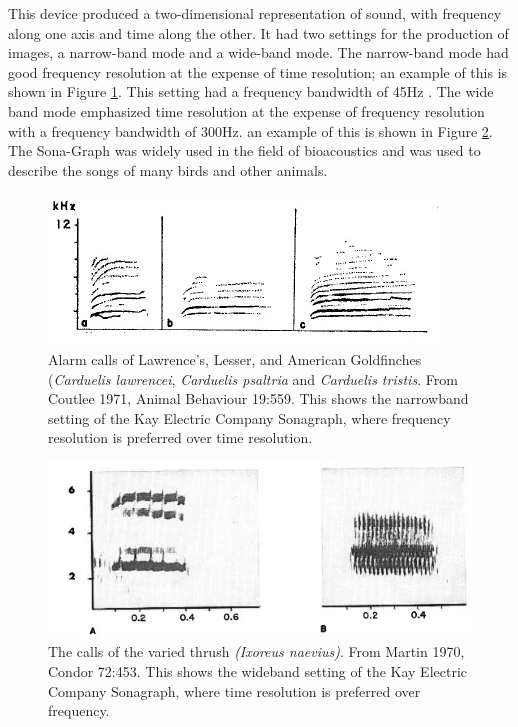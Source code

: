 \documentclass[12pt,oneside]{book}
\begin{document}
This device produced a two-dimensional representation of sound, with
frequency along one axis and time along the other.  It had two
settings for the production of images, a narrow-band mode and a
wide-band mode.  The narrow-band mode had good frequency resolution at
the expense of time resolution; an example of this is shown in Figure
\ref{fig:sonagraph1}.  This setting had a frequency bandwidth of 45Hz
\cite{nowicki1988birds}.  The wide band mode emphasized time
resolution at the expense of frequency resolution with a frequency
bandwidth of 300Hz. an example of this is shown in Figure
\ref{fig:sonagraph2}.  The Sona-Graph was widely used in the field of
bioacoustics and was used to describe the songs of many birds and
other animals.

\begin{figure}[t]
\centering
\includegraphics[width=\columnwidth]{figures/sonagraph1}
\caption{Alarm calls of Lawrence's, Lesser, and American Goldfinches
  (\textit{Carduelis lawrencei}, \textit{Carduelis psaltria} and
  \textit{Carduelis tristis}. From Coutlee 1971, Animal Behaviour
  19:559.  This shows the narrowband setting of the Kay Electric
  Company Sonagraph, where frequency resolution is preferred over time
  resolution.}
\label{fig:sonagraph1}
\end{figure}

\begin{figure}[t]
\centering
\includegraphics[width=\columnwidth]{figures/sonagraph2}
\caption{The calls of the varied thrush \textit{(Ixoreus
    naevius)}. From Martin 1970, Condor 72:453.  This shows the
  wideband setting of the Kay Electric Company Sonagraph, where time
  resolution is preferred over frequency.}
\label{fig:sonagraph2}
\end{figure}
\end{document}
